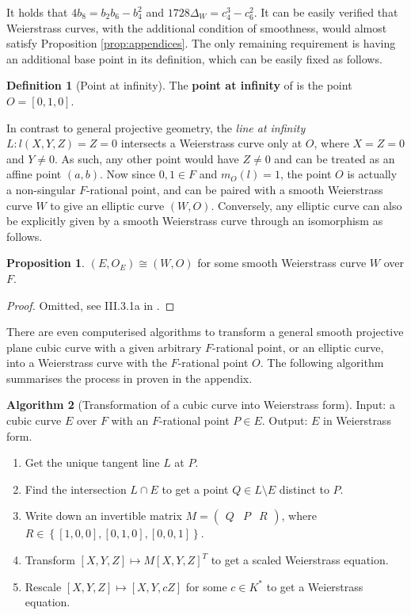\documentclass{article}
\newcommand{\rb}[1]{\left( #1 \right)}
\renewcommand{\sb}[1]{\left[ #1 \right]}
\newcommand{\cb}[1]{\left\{ #1 \right\}}
\theoremstyle{definition}\newtheorem*{definition}{Definition}
\theoremstyle{definition}\newtheorem*{example}{Example}
\theoremstyle{definition}\newtheorem*{remark}{Remark}
\newtheorem{proposition}{Proposition}[subsection]
\newtheorem{algorithm}[proposition]{Algorithm}
\begin{document}
It holds that $ 4b_8 = b_2b_6 - b_4^2 $ and $ 1728\Delta_W = c_4^3 - c_6^2 $. It can be easily verified that Weierstrass curves, with the additional condition of smoothness, would almost satisfy Proposition \ref{prop:appendices}. The only remaining requirement is having an additional base point in its definition, which can be easily fixed as follows.

\begin{definition}[Point at infinity]
The \textbf{point at infinity} of is the point $ O = \sb{0, 1, 0} $.
\end{definition}

In contrast to general projective geometry, the \emph{line at infinity} $ L : l\rb{X, Y, Z} = Z = 0 $ intersects a Weierstrass curve only at $ O $, where $ X = Z = 0 $ and $ Y \ne 0 $. As such, any other point would have $ Z \ne 0 $ and can be treated as an affine point $ \rb{a, b} $. Now since $ 0, 1 \in F $ and $ m_O\rb{l} = 1 $, the point $ O $ is actually a non-singular $ F $-rational point, and can be paired with a smooth Weierstrass curve $ W $ to give an elliptic curve $ \rb{W, O} $. Conversely, any elliptic curve can also be explicitly given by a smooth Weierstrass curve through an isomorphism as follows.

\begin{proposition}
$ \rb{E, O_E} \cong \rb{W, O} $ for some smooth Weierstrass curve $ W $ over $ F $.
\end{proposition}

\begin{proof}
Omitted, see III.3.1a in \cite{gtm}.
\end{proof}

There are even computerised algorithms to transform a general smooth projective plane cubic curve with a given arbitrary $ F $-rational point, or an elliptic curve, into a Weierstrass curve with the $ F $-rational point $ O $. The following algorithm summarises the process in \cite{weierstrass} proven in the appendix.

\begin{algorithm}[Transformation of a cubic curve into Weierstrass form]
Input: a cubic curve $ E $ over $ F $ with an $ F $-rational point $ P \in E $. Output: $ E $ in Weierstrass form.
\begin{enumerate}
\item Get the unique tangent line $ L $ at $ P $.
\item Find the intersection $ L \cap E $ to get a point $ Q \in L \setminus E $ distinct to $ P $.
\item Write down an invertible matrix $ M = \begin{pmatrix} Q & P & R \end{pmatrix} $, where $ R \in \cb{\sb{1, 0, 0}, \sb{0, 1, 0}, \sb{0, 0, 1}} $.
\item Transform $ \sb{X, Y, Z} \mapsto M\sb{X, Y, Z}^T $ to get a scaled Weierstrass equation.
\item Rescale $ \sb{X, Y, Z} \mapsto \sb{X, Y, cZ} $ for some $ c \in K^* $ to get a Weierstrass equation.
\end{enumerate}
\end{algorithm}
\end{document}
